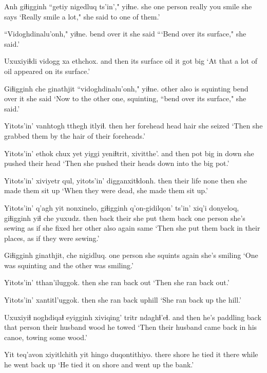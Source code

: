 \documentclass[12pt]{article}
\begin{document}
\gll Anh giɬigginh ``getiy nigedluq ts'in'," yiɬne.
she {one person} really {you smile}  {she says}
\glt `Really smile a lot," she said to one of them.'
\glend 

\gll ``Vidoghdinalu'onh,"  yiɬne.
{bend over it}  {she said}
\glt ```Bend over its surface," she said.'
\glend 

\gll Uxuxiyiɬdi vidogg xa ethchox.
{and then}  {its surface} oil {it got big}
\glt `At that a lot of oil appeared on its surface.'
\glend 

\gll Giɬigginh che ginathjit ``vidoghdinalu'onh," yiɬne.
other also {is squinting} {bend over it} {she said}
\glt `Now to the other one, squinting, ``bend over its surface," she said.'
\glend 

\gll Yitots'in' vanhtogh tthegh itlyiɬ.
then  {her forehead} {head hair} {she seized}
\glt `Then she grabbed them by the hair of their foreheads.'
\glend 

\gll Yitots'in' ethok chux yet yiggi yeniɬtrit, xivitthe'.
{and then} pot big in down {she pushed} {their head}
\glt `Then she pushed their heads down into the big pot.'
\glend 

\gll Yitots'in' xiviyetr qul,  yitots'in' digganxitɬdonh.
then  {their life} none then {she made them sit up}
\glt `When they were dead, she made them sit up.'
\glend 

\gll Yitots'in' q'agh   yit nonxinelo, giɬigginh q'on-gidilqon' ts'in' xiq'i donyeloq, giɬigginh yiɬ che yuxudz.
then  back their {she put them back} {one person} {she's sewing} {}  {as if} {she fixed her} other also again same
\glt `Then she put them back in their places, as if they were sewing.'
\glend 

\gll Giɬigginh ginathjit, che  nigidluq.
{one person} {she squints} again {she's smiling}
\glt `One was squinting and the other was smiling.'
\glend 

\gll Yitots'in' tthan'iluggok.
then  {she ran back out}
\glt `Then she ran back out.'
\glend 

\gll Yitots'in' xantitl'uggok.
then  {she ran back uphill}
\glt `She ran back up the hill.'
\glend 

\gll Uxuxiyiɬ noghdiqaɬ   eyigginh xiviqing' tritr ndaghɬ'eɬ.
{and then}  {he's paddling back} {that person} {their husband} wood {he towed}
\glt `Then their husband came back in his canoe, towing some wood.'
\glend 

\gll Yit teq'avon xiyitlchith yit hingo duqontithiyo.
there shore {he tied it} there while {he went back up}
\glt `He tied it on shore and went up the bank.'
\glend 
\end{document}
